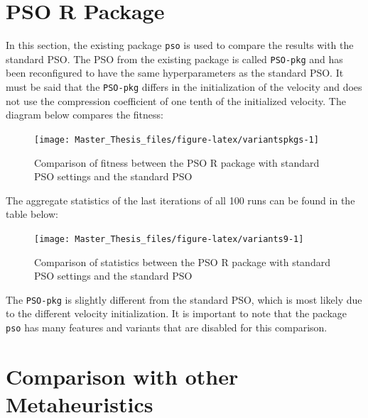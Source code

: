 \documentclass[
  oneside, a4paper, 12pt, openany]{book}
\theoremstyle{definition}
\theoremstyle{definition}
\theoremstyle{definition}
\theoremstyle{definition}
\theoremstyle{remark}
\begin{document}
\hypertarget{pso-r-package}{%
\section{PSO R Package}\label{pso-r-package}}

In this section, the existing package \texttt{pso} is used to compare the results with the standard PSO. The PSO from the existing package is called \texttt{PSO-pkg} and has been reconfigured to have the same hyperparameters as the standard PSO. It must be said that the \texttt{PSO-pkg} differs in the initialization of the velocity and does not use the compression coefficient of one tenth of the initialized velocity. The diagram below compares the fitness:

\vspace{-0.1cm}

\begin{figure}[H]
\texttt{[image: Master\_Thesis\_files/figure-latex/variantspkgs-1]} \caption{Comparison of fitness between the PSO R package with standard PSO settings and the standard PSO}\label{fig:variantspkgs}
\end{figure}

\vspace{-0.1cm}

The aggregate statistics of the last iterations of all 100 runs can be found in the table below:
\vspace{-0.2cm}

\begin{figure}[H]
\texttt{[image: Master\_Thesis\_files/figure-latex/variants9-1]} \caption{Comparison of statistics between the PSO R package with standard PSO settings and the standard PSO}\label{fig:variants9}
\end{figure}
\vspace{-0.5cm}

The \texttt{PSO-pkg} is slightly different from the standard PSO, which is most likely due to the different velocity initialization. It is important to note that the package \texttt{pso} has many features and variants that are disabled for this comparison.

\hypertarget{comparison-with-other-metaheuristics}{%
\section{Comparison with other Metaheuristics}\label{comparison-with-other-metaheuristics}}
\end{document}
